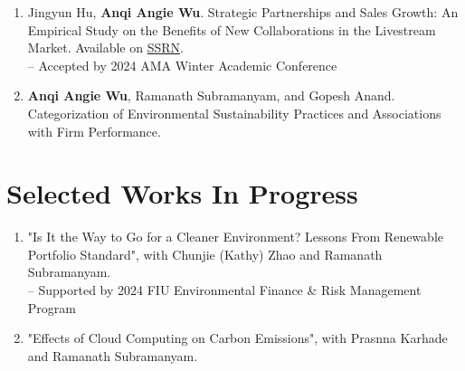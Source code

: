 \documentclass[margin,line]{resume}
\begin{document}
\begin{resume}
\begin{enumerate}[topsep=0pt, leftmargin=*]
           \item Jingyun Hu, \textbf{Anqi Angie Wu}. Strategic Partnerships and Sales Growth: An Empirical Study on the Benefits of New Collaborations in the Livestream Market. Available on \href{https://papers.ssrn.com/abstract=4656779}{{SSRN}}. \\[0.3em]
       -- Accepted by 2024 AMA Winter Academic Conference\\[-0.5em]

 \item \textbf{Anqi Angie Wu}, Ramanath Subramanyam, and Gopesh Anand. 
       Categorization of Environmental Sustainability Practices and Associations with Firm Performance. 
        
       
\end{enumerate}   
  
 	  \section{\mysidestyle Selected Works In Progress} 
 	  \begin{enumerate}[topsep=0pt, leftmargin=*]
         

         \item "Is It the Way to Go for a Cleaner Environment? Lessons From Renewable Portfolio Standard", with Chunjie (Kathy) Zhao and Ramanath Subramanyam.  \\[0.3em]
         -- Supported by 2024 FIU Environmental Finance \& Risk Management Program
       \item "Effects of Cloud Computing on Carbon Emissions", with Prasnna Karhade and Ramanath Subramanyam. 



\end{enumerate}
\end{resume}
\end{document}
